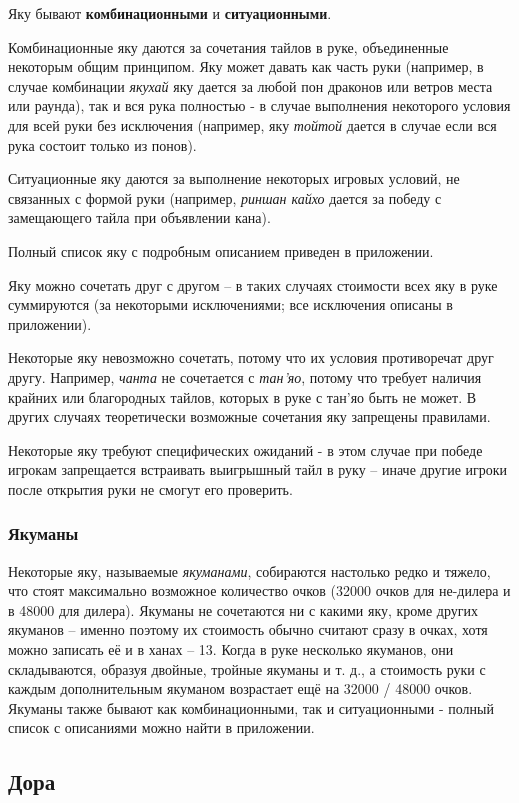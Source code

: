 Яку бывают \textbf{комбинационными} и \textbf{ситуационными}. 

Комбинационные яку даются за сочетания тайлов в руке, объединенные некоторым общим принципом. Яку может давать как часть руки (например, в случае комбинации \textit{якухай} яку дается за любой пон драконов или ветров места или раунда), так и вся рука полностью - в случае выполнения некоторого условия для всей руки без исключения (например, яку \textit{тойтой} дается в случае если вся рука состоит только из понов). 

Ситуационные яку даются за выполнение некоторых игровых условий, не связанных с формой руки (например, \textit{риншан кайхо} дается за победу с замещающего тайла при объявлении кана).

Полный список яку с подробным описанием приведен в приложении.

Яку можно сочетать друг с другом – в таких случаях стоимости всех яку в руке суммируются (за некоторыми исключениями; все исключения описаны в приложении).

Некоторые яку невозможно сочетать, потому что их условия противоречат друг другу. Например, \textit{чанта} не сочетается с \textit{тан'яо}, потому что требует наличия крайних или благородных тайлов, которых в руке с тан'яо быть не может. В других случаях теоретически возможные сочетания яку запрещены правилами.

Некоторые яку требуют специфических ожиданий - в этом случае при победе игрокам запрещается встраивать выигрышный тайл в руку – иначе другие игроки после открытия руки не смогут его проверить.

\subsubsection{Якуманы}

Некоторые яку, называемые \textit{якуманами}, собираются настолько редко и тяжело, что стоят максимально возможное количество очков (32000 очков для не-дилера и в 48000 для дилера). Якуманы не сочетаются ни с какими яку, кроме других якуманов – именно поэтому их стоимость обычно считают сразу в очках, хотя можно записать её и в ханах – 13. Когда в руке несколько якуманов, они складываются, образуя двойные, тройные якуманы и т. д., а стоимость руки с каждым дополнительным якуманом возрастает ещё на 32000 / 48000 очков. Якуманы также бывают как комбинационными, так и ситуационными - полный список с описаниями можно найти в приложении.

\subsection{Дора}

